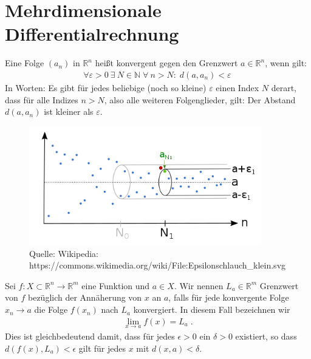 \section{Mehrdimensionale Differentialrechnung}

\begin{Definition}[Konvergenz]
 Eine Folge $(a_n)$ in $\mathbb{R}^n$ heißt konvergent gegen den Grenzwert $a \in \mathbb{R}^n$, wenn gilt:
\begin{align*}
\forall {\varepsilon > 0} \ \exists \ N \in \mathbb{N} \; \forall \ n > N: \; d(a, a_n) < \varepsilon\,
\end{align*}
In Worten: Es gibt für jedes beliebige (noch so kleine) $\varepsilon$ einen Index $N$ derart, dass für alle Indizes $n > N$, also alle weiteren Folgenglieder, gilt: Der Abstand $d(a, a_n)$ ist kleiner als $\varepsilon$.
\end{Definition}

\begin{figure}[H]
      \centering
    \includegraphics[width=0.9\textwidth]{images/500px-Epsilonschlauch_klein}
      \caption{Quelle: Wikipedia: https://commons.wikimedia.org/wiki/File:Epsilonschlauch\_klein.svg}
\end{figure}



\begin{Definition}[Grenzwert]
Sei $f :X \subset \mathbb{R}^n \to \mathbb{R}^m$ eine  Funktion und $a \in X$. Wir nennen $L_a \in \mathbb{R}^m$ Grenzwert von $f$ bezüglich der Annäherung von $x$ an $a$, falls für jede  konvergente Folge $x_n \to a$  die Folge $f(x_n)$ nach $L_a$ konvergiert.  In diesem Fall bezeichnen wir
\begin{align*}
\lim_{x \to a} f(x) = L_a \;.
\end{align*}
Dies ist gleichbedeutend damit, dass für jedes $\epsilon > 0$ ein $\delta > 0$ existiert, so dass
$d(f(x) ,L_a) < \epsilon$ gilt für jedes $x$ mit $d(x, a) < \delta$.
\end{Definition}


